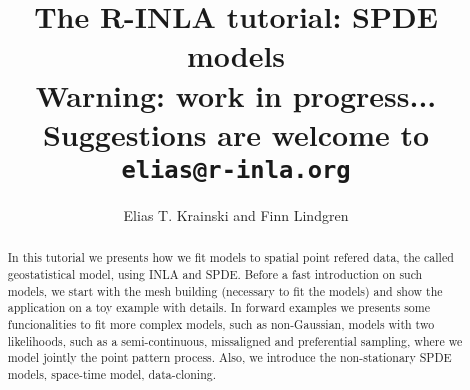 \documentclass[a4paper,11pt]{report}
\title{\textbf{The R-INLA tutorial: SPDE models}\\
Warning: work in progress...\\
Suggestions are welcome to \texttt{elias@r-inla.org}}
\author{Elias T. Krainski and Finn Lindgren}
\begin{document}
\maketitle

\begin{abstract}
  In this tutorial we presents how we fit models 
  to spatial point refered data, the called 
  geostatistical model, using INLA and SPDE. 
  Before a fast introduction on such models, 
  we start with the mesh building 
  (necessary to fit the models) and show the application 
  on a toy example with details. 
  In forward examples we presents some funcionalities 
  to fit more complex models, such as  non-Gaussian,  
  models with two likelihoods, such as a semi-continuous,  
  missaligned and preferential sampling, where we model 
  jointly the point pattern process. Also, we introduce 
  the non-stationary SPDE models, space-time model, data-cloning.
\end{abstract} 

 

\tableofcontents

 

 
 
 
 
 
 
 
 



\end{document}
